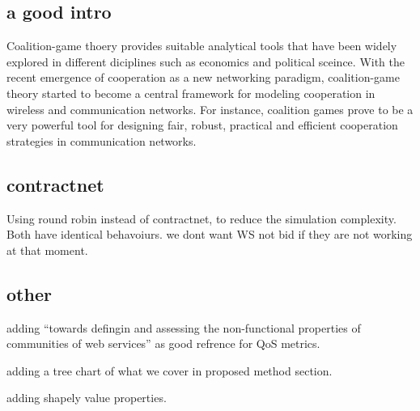 \documentclass{article}
\begin{document}
\subsection{a good intro}
Coalition-game thoery provides suitable analytical tools that have been widely explored in different diciplines such as economics and political sceince. With the recent emergence of cooperation as a new networking paradigm, coalition-game  theory started to become a central framework for modeling cooperation in wireless and communication networks. For instance, coalition games prove to be a very powerful tool for designing fair, robust, practical and efficient cooperation strategies in communication networks. 

\subsection{contractnet}

Using round robin instead of contractnet, to reduce the simulation complexity. Both have identical behavoiurs.
we dont want WS not bid if they are not working at that moment.

\subsection{other}

adding "`towards defingin and assessing the non-functional properties of communities of web services"' as good refrence for QoS metrics.



adding a tree chart of what we cover in proposed method section.

adding shapely value properties.



\end{document}
